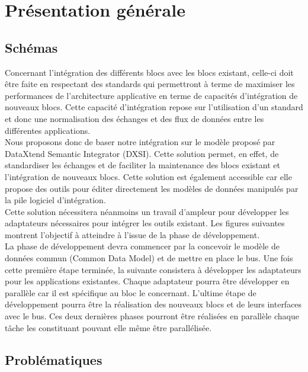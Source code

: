 \section{Présentation générale}

\subsection{Schémas}

Concernant l’intégration des différents blocs avec les blocs existant, celle-ci doit être faite en respectant des standards qui permettront à terme de maximiser les performances de l’architecture applicative en terme de capacités d’intégration de nouveaux blocs. Cette capacité d’intégration repose sur l’utilisation d’un standard et donc une normalisation des échanges et des flux de données entre les différentes applications. \\

Nous proposons donc de baser notre intégration sur le modèle proposé par DataXtend Semantic Integrator (DXSI). Cette solution permet, en effet, de standardiser les échanges et de faciliter la maintenance des blocs existant et l’intégration de nouveaux blocs. Cette solution est également accessible car elle propose des outils pour éditer directement les modèles de données manipulés par la pile logiciel d’intégration. \\

Cette solution nécessitera néanmoins un travail d’ampleur pour développer les adaptateurs nécessaires pour intégrer les outils existant. Les figures suivantes montrent l’objectif à atteindre à l’issue de la phase de développement. \\
    
La phase de  développement devra commencer par la concevoir le modèle de données commun (Common Data Model) et de mettre en place le bus. Une fois cette première étape terminée, la suivante consistera à développer les adaptateurs pour les applications existantes. Chaque adaptateur pourra être développer en parallèle car il est spécifique au bloc le concernant. L’ultime étape de développement pourra être la réalisation des nouveaux blocs et de leurs interfaces avec le bus. Ces deux dernières phases pourront être réalisées en parallèle chaque tâche les constituant pouvant elle même être parallélisée. \\


\subsection{Problématiques}

